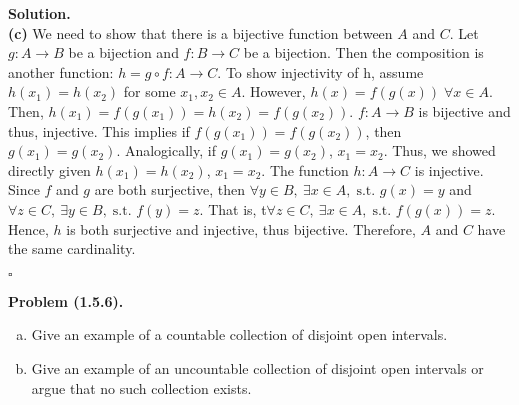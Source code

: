 \documentclass[12pt]{article}
\theoremstyle{definition}
\theoremstyle{remark}
\newenvironment{problem}[1]{
    \vspace{1em}
    \noindent
    \textbf{Problem #1.} 
}{
    \vspace{1em}
}
\newenvironment{solution}{
    \noindent
    \textbf{Solution.}\\
}{
    \quad \hfill $\square$
    \vspace{1em}
}
\begin{document}
\begin{solution}
\noindent
\textbf{(c)} 
We need to show that there is a bijective function between $A$ and $C$. Let $g: A \to B$ be a bijection and $f: B \to C$ be a bijection. Then the composition is another function: $h=g \circ f : A \to C$. To show injectivity of h, assume $h(x_1)=h(x_2)$ for some $x_1, x_2 \in A$. However, $h(x)=f(g(x)) \; \forall x \in A$. Then, $h(x_1)=f(g(x_1))=h(x_2)=f(g(x_2))$. $f:A\rightarrow{B}$ is bijective and thus, injective. This implies if $f(g(x_1))=f(g(x_2))$, then $g(x_1)=g(x_2)$. Analogically, if $g(x_1)=g(x_2)$, $x_1=x_2$. Thus, we showed directly given $h(x_1)=h(x_2)$, $x_1=x_2$. The function $h:A\rightarrow{C}$ is injective. Since $f$ and $g$ are both surjective, then $\forall y \in B, \ \exists x \in A, \; \text{s.t. } g(x)=y$ and $\forall z \in C, \ \exists y \in B, \; \text{s.t. } f(y)=z$. That is, t$\forall z \in C, \ \exists x \in A, \; \text{s.t. } f(g(x))=z$. Hence, $h$ is both surjective and injective, thus bijective. Therefore, $A$ and $C$ have the same cardinality.
\end{solution}


\begin{problem}{(1.5.6)}
    \begin{enumerate}[(a)] \item Give an example of a countable collection of disjoint
open intervals.

    \item Give an example of an uncountable collection of disjoint open intervals or argue that no such collection exists.
\end{enumerate}
\end{problem}
\end{document}
